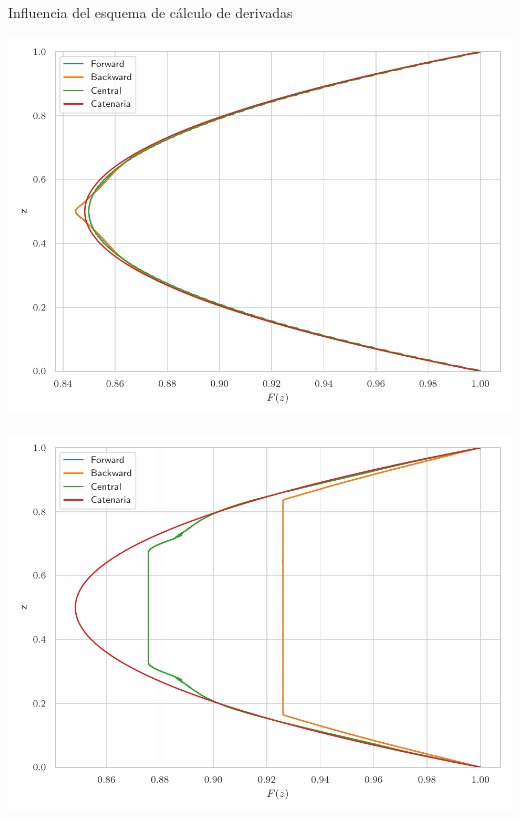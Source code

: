 \documentclass[11pt]{beamer}
\begin{document}
\begin{frame}{Influencia del esquema de cálculo de derivadas}
                \vspace{0.1cm} %
            
                \begin{minipage}[b]{0.43\textwidth}
                    \centering
                    \includegraphics[width=\textwidth]{Figuras/sol_deriv_n200.pdf}
                \end{minipage}
                \hfill
                \begin{minipage}[b]{0.43\textwidth}
                    \centering
                    \includegraphics[width=\textwidth]{Figuras/sol_deriv_n600.pdf}
                \end{minipage}
            \end{frame}
\end{document}
